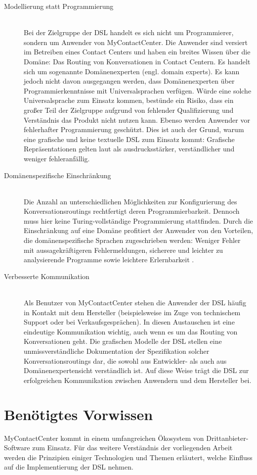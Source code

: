 \begin{description}
\item[Modellierung statt Programmierung] \hfill \\
Bei der Zielgruppe der DSL handelt es sich nicht um Programmierer, sondern um Anwender von MyContactCenter. Die Anwender sind versiert im Betreiben eines Contact Centers und haben ein breites Wissen über die Domäne: Das Routing von Konversationen in Contact Centern. Es handelt sich um sogenannte Domänenexperten (engl. domain experts). Es kann jedoch nicht davon ausgegangen werden, dass Domänenexperten über Programmierkenntnisse mit Universalsprachen verfügen. Würde eine solche Universalsprache zum Einsatz kommen, bestünde ein Risiko, dass ein großer Teil der Zielgruppe aufgrund von fehlender Qualifizierung und Verständnis das Produkt nicht nutzen kann. Ebenso werden Anwender vor fehlerhafter Programmierung geschützt. Dies ist auch der Grund, warum eine grafische und keine textuelle DSL zum Einsatz kommt: Grafische Repräsentationen gelten laut \cite[S. 50f]{Kelly:08} als ausdrucksstärker, verständlicher und weniger fehleranfällig.
\item[Domänenspezifische Einschränkung] \hfill \\
Die Anzahl an unterschiedlichen Möglichkeiten zur Konfigurierung des Konversationsroutings rechtfertigt deren Programmierbarkeit. Dennoch muss hier keine Turing-vollständige Programmierung stattfinden. Durch die Einschränkung auf eine Domäne profitiert der Anwender von den Vorteilen, die domänenspezifische Sprachen zugeschrieben werden: Weniger Fehler mit aussagekräftigeren Fehlermeldungen, sicherere und leichter zu analysierende Programme sowie leichtere Erlernbarkeit \cite{Tomassetti:17}.
\item[Verbesserte Kommunikation] \hfill \\
Als Benutzer von MyContactCenter stehen die Anwender der DSL häufig in Kontakt mit dem Hersteller (beispielsweise im Zuge von technischem Support oder bei Verkaufsgesprächen). In diesen Austauschen ist eine eindeutige Kommunikation wichtig, auch wenn es um das Routing von Konversationen geht. Die grafischen Modelle der DSL stellen eine unmissverständliche Dokumentation der Spezifikation solcher Konversationsroutings dar, die sowohl aus Entwickler- als auch aus Domänenexpertensicht verständlich ist. Auf diese Weise trägt die DSL zur erfolgreichen Kommunikation zwischen Anwendern und dem Hersteller bei.
\end{description}


\section{Benötigtes Vorwissen}
MyContactCenter kommt in einem umfangreichen Ökosystem von Drittanbieter-Software zum Einsatz. Für das weitere Verständnis der vorliegenden Arbeit werden die Prinzipien einiger Technologien und Themen erläutert, welche Einfluss auf die Implementierung der DSL nehmen. 

